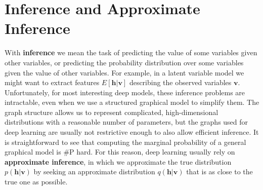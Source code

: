 \section{Inference and Approximate Inference}
With \textbf{inference} we mean the task of predicting the value of some variables given other variables, or predicting the probability distribution over some variables given the value of other variables.\newline\newline
For example, in a latent variable model we might want to extract features $E[\textbf{h} | \textbf{v}]$ describing the observed variables $\textbf{v}$.\newline\newline
Unfortunately, for most interesting deep models, these inference problems are intractable, even when we use a structured graphical model to simplify them. The graph structure allows us to represent complicated, high-dimensional distributions with a reasonable number of parameters, but the graphs used for deep learning are usually not restrictive enough to also allow efficient inference. It is straightforward to see that computing the marginal probability of a general graphical model is \#P hard.\newline\newline
For this reason, deep learning usually rely on \textbf{approximate inference}, in which we approximate the true distribution $p(\textbf{h} | \textbf{v})$ by seeking an approximate distribution $q(\textbf{h}|\textbf{v})$ that is as
close to the true one as possible.

